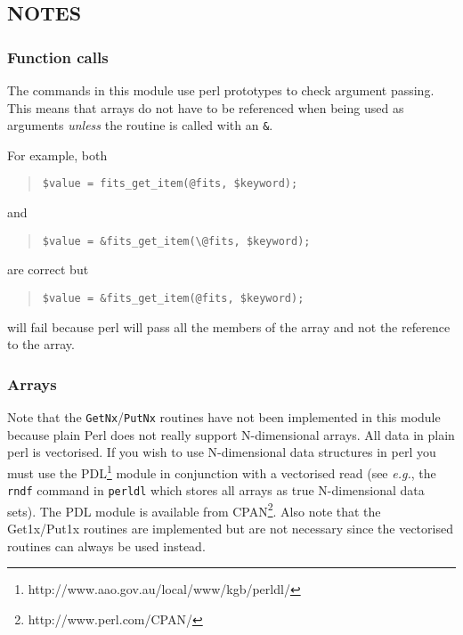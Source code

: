 \documentclass[twoside,11pt]{article}
\newcommand{\htmladdnormallinkfoot}[2]{#1\footnote{#2}}
\newcommand{\xlabel}[1]{}
\newenvironment{myquote}{\begin{quote}\begin{small}}{\end{small}\end{quote}}
\begin{document}
\subsection{\xlabel{notes}\label{notes}NOTES}

\subsubsection{Function calls}%

The commands in this module use  perl prototypes to check argument
passing. This means that arrays do not have to be referenced when being
used as arguments \emph{unless\/} the routine is called with an \texttt{\&}.

For example, both

\begin{myquote}
\begin{verbatim}
$value = fits_get_item(@fits, $keyword);
\end{verbatim}
\end{myquote}
and
\begin{myquote}
\begin{verbatim}
$value = &fits_get_item(\@fits, $keyword);
\end{verbatim}
\end{myquote}

are correct but
\begin{myquote}
\begin{verbatim}
$value = &fits_get_item(@fits, $keyword);
\end{verbatim}
\end{myquote}

will fail because perl will pass all the members of the array and not the
reference to the array.

\subsubsection{Arrays}%

Note that the \texttt{GetNx}/\texttt{PutNx} routines have not been
implemented in this module because plain Perl does not really support
N-dimensional arrays.  All data in plain perl is vectorised.  If you
wish to use N-dimensional data structures in perl you must use the
\htmladdnormallinkfoot{PDL}{http://www.aao.gov.au/local/www/kgb/perldl/}
module in conjunction with a vectorised read (see \emph{e.g.}, the
\texttt{rndf} command in \texttt{perldl} which stores all arrays as
true N-dimensional data sets). The PDL module is available from
\htmladdnormallinkfoot{CPAN}{http://www.perl.com/CPAN/}. Also
note that the Get1x/Put1x routines are implemented but are not
necessary since the vectorised routines can always be used instead.
\end{document}

